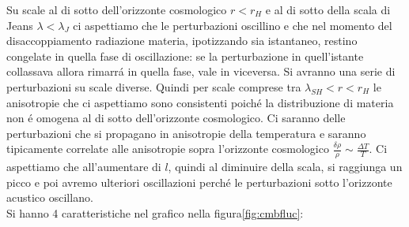 \documentclass[12pt, a4paper]{article}
\begin{document}
Su scale al di sotto dell'orizzonte cosmologico  $r<r_H$ e al di sotto della scala di Jeans $\lambda<\lambda_J$ ci aspettiamo che le perturbazioni oscillino e che nel momento del disaccoppiamento radiazione materia, ipotizzando sia istantaneo, restino congelate in quella fase di oscillazione: se la perturbazione in quell'istante collassava allora rimarr\'{a} in quella fase, vale in viceversa. Si avranno una serie di perturbazioni su scale diverse.  Quindi per scale comprese tra $\lambda_{SH}<r<r_H$ le anisotropie che ci aspettiamo sono consistenti poich\'{e} la distribuzione di materia non \'{e} omogena al di sotto dell'orizzonte cosmologico. Ci saranno delle perturbazioni che si propagano in anisotropie della temperatura e saranno tipicamente correlate alle anisotropie sopra l'orizzonte cosmologico $\frac{\delta \rho}{\rho}\sim \frac{\Delta T}{T}$. Ci aspettiamo che all'aumentare di $l$, quindi al diminuire della scala, si raggiunga un picco e poi avremo ulteriori oscillazioni perch\'{e} le perturbazioni sotto l'orizzonte acustico oscillano.\\
Si hanno 4 caratteristiche nel grafico nella figura\ref{fig:cmbfluc}:\\
\end{document}
